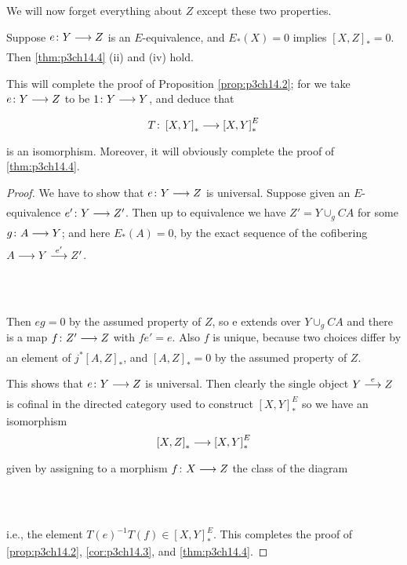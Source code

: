 \documentclass[../main]{subfiles}
\begin{document}
We will now forget everything about $Z$ except these two properties.
\begin{lemma} \label{lem:p3ch14.11}
Suppose $e\colon Y \lar{} Z$ is an $E$-equivalence, and $E_{\ast}(X)=0$ implies $\left[X,Z\right]_{\ast}=0$. Then \ref{thm:p3ch14.4} (ii) and (iv) hold.

This will complete the proof of Proposition \ref{prop:p3ch14.2}; for we take $e\colon  Y \lar{}  Z $ to be  $1\colon  Y \lar{}  Y $, and deduce that 
\[
  T\colon  \left[X,Y\right]_{\ast} \lar{} \left[X,Y\right]^E_{\ast}  
\] 
is an isomorphism. Moreover, it will obviously complete the proof of \ref{thm:p3ch14.4}. 
\begin{proof} 
    We have to show that $e\colon  Y \lar{}  Z $ is universal. Suppose given an $E$-equivalence $e'\colon  Y \lar{}  Z' $. Then up to equivalence we have $Z'= Y \displaystyle{\cup_{g}} CA $ for some $g\colon  A \lar{}  Y $; and here $E_{\ast}(A)=0$, by the exact sequence of the cofibering $A \lar{} Y \vra{e'} Z'$.
    ~\\~\\
    ~\\~\\
 Then $eg = 0$ by the assumed property of $Z$, so e extends over $Y \displaystyle{\cup_{g}}  CA$ and there is a map $f\colon  Z' \lar{}  Z $ with $fe'=e$. Also $f$ is unique, because two choices differ by an element of $j^\ast\left[A,Z\right]_{\ast}$, and $ \left[A,Z\right]_{\ast}=0$ by the assumed property of $Z$.   

This shows that $e\colon  Y \lar{}  Z $ is universal. Then clearly the single object $Y\vra{e} Z$ is cofinal in the directed category used to construct $ \left[X,Y\right]^E_{\ast}$ so we have an isomorphism
\[
  \left[X,Z\right]_\ast \lar{} \left[X,Y\right]^E_{\ast}
\] 
given by assigning to a morphism $f\colon  X \lar{}  Z $ the class of the diagram
~\\~\\
~\\~\\
i.e., the element $T(e)^{-1}T(f) \in \left[X,Y\right]^E_{\ast}$. This completes the proof of \ref{prop:p3ch14.2}, \ref{cor:p3ch14.3}, and \ref{thm:p3ch14.4}.
\end{proof}
\end{lemma}
\end{document}
